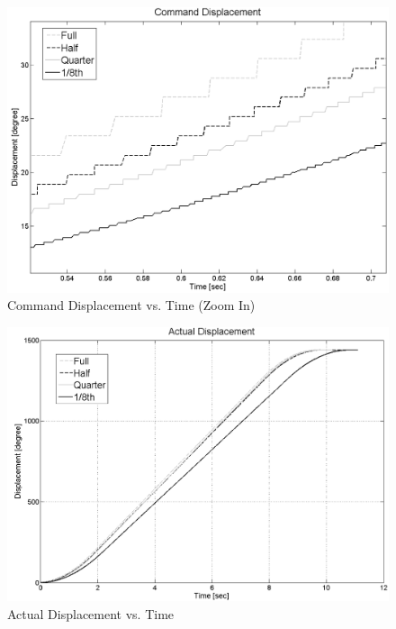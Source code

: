 \documentclass{article}
\theoremstyle{plain}
\theoremstyle{definition}
\theoremstyle{remark}
\begin{document}
\begin{figure}[h]
\includegraphics[width=1\textwidth]{Q4_CommandPosition_L.png}
\caption{Command Displacement vs. Time (Zoom In)} \label{tex}
\label{fig:q4_8}
\end{figure}

\begin{figure}[h]
\includegraphics[width=1\textwidth]{Q4_ActualPosition.png}
\caption{Actual Displacement vs. Time} \label{tex}
\label{fig:q4_9}
\end{figure}
\end{document}
